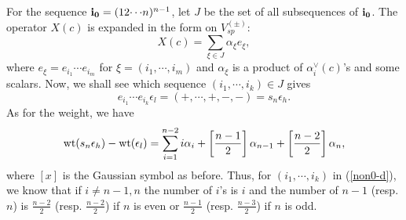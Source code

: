 For the sequence $\bfii0=(12{\cdots} n)^{n-1}$, 
let $J$ be the set of all subsequences of $\bfii0$.
The operator $X(c)$ is expanded in the form on $V_{sp}^{(\pm)}$:
\begin{equation}\label{expand-d}
X(c)=\sum_{\xi\in J}{\alpha}_\xi e_\xi,
\end{equation}
where $e_\xi=e_{i_1}{\cdots} e_{i_m}$ for $\xi=(i_1,{\cdots},i_m)$ and ${\alpha}_\xi$ 
is a product of ${\alpha}_i^\vee(c)$'s
and some scalars. 
Now, we shall see which sequence $(i_1,{\cdots},i_k)\in J$ gives
\begin{equation}\label{non0-d}
 e_{i_1}{\cdots} e_{i_k}{\epsilon}_l=(+,{\cdots},+,-,-)=s_n{\epsilon}_h.
\end{equation}
As for the weight, we have
\begin{equation}\label{wt-dif-d}
{{\rm wt}}(s_n{\epsilon}_h)-{{\rm wt}}({\epsilon}_l)=
\sum_{i=1}^{n-2}i{\alpha}_i+\left[\frac{n-1}{2}\right]{\alpha}_{n-1}+
\left[\frac{n-2}{2}\right]{\alpha}_{n},
\end{equation}
where $[x]$ is the Gaussian symbol as before.
Thus, for $(i_1,{\cdots},i_k)$ in (\ref{non0-d}), we know that
if $i\ne n-1,n$ the number of $i$'s is $i$ and the number of $n-1$
(resp. $n$) is $\frac{n-2}{2}$ (resp. $\frac{n-2}{2}$) if $n$ is even or
$\frac{n-1}{2}$ (resp. $\frac{n-3}{2}$) if $n$ is odd.

